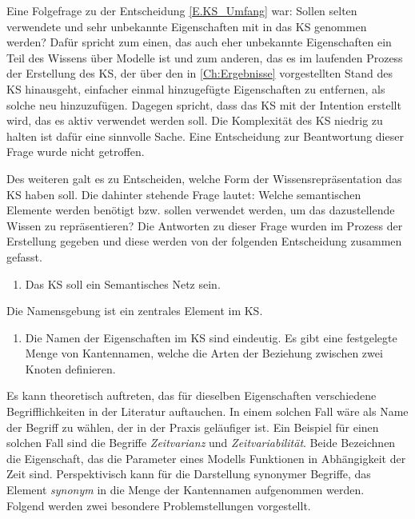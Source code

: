 Eine Folgefrage zu der Entscheidung \ref{E.KS_Umfang} war: Sollen selten verwendete und sehr unbekannte Eigenschaften mit in das KS genommen werden? Dafür spricht zum einen, das auch eher unbekannte Eigenschaften ein Teil des Wissens über Modelle ist und zum anderen, das es im laufenden Prozess der Erstellung des KS, der über den in \ref{Ch:Ergebnisse} vorgestellten Stand des KS hinausgeht, einfacher einmal hinzugefügte Eigenschaften zu entfernen, als solche neu hinzuzufügen. Dagegen spricht, dass das KS mit der Intention erstellt wird, das es aktiv verwendet werden soll. Die Komplexität des KS niedrig zu halten ist dafür eine sinnvolle Sache. Eine Entscheidung zur Beantwortung dieser Frage wurde nicht getroffen.

Des weiteren galt es zu Entscheiden, welche Form der Wissensrepräsentation das KS haben soll. Die dahinter stehende Frage lautet: Welche semantischen Elemente werden benötigt bzw. sollen verwendet werden, um das dazustellende Wissen zu repräsentieren? Die Antworten zu dieser Frage wurden im Prozess der Erstellung gegeben und diese werden von der folgenden Entscheidung zusammen gefasst.
\begin{enumerate}[resume*]
	\item \label{E.KS_SemantischesNetz}Das KS soll ein Semantisches Netz sein. %
\end{enumerate}

Die Namensgebung ist ein zentrales Element im KS.
\begin{enumerate}[resume*]
	\item \label{E.KS_Namensgebung}Die Namen der Eigenschaften im KS sind eindeutig. Es gibt eine festgelegte Menge von Kantennamen, welche die Arten der Beziehung zwischen zwei Knoten definieren.
\end{enumerate}
Es kann theoretisch auftreten, das für dieselben Eigenschaften verschiedene Begrifflichkeiten in der Literatur auftauchen. In einem solchen Fall wäre als Name der Begriff zu wählen, der in der Praxis geläufiger ist. Ein Beispiel für einen solchen Fall sind die Begriffe \textit{Zeitvarianz} und \textit{Zeitvariabilität}. Beide Bezeichnen die Eigenschaft, das die Parameter eines Modells Funktionen in Abhängigkeit der Zeit sind. Perspektivisch kann für die Darstellung synonymer Begriffe, das Element \textit{synonym} in die Menge der Kantennamen aufgenommen werden.\\
Folgend werden zwei besondere Problemstellungen vorgestellt.

